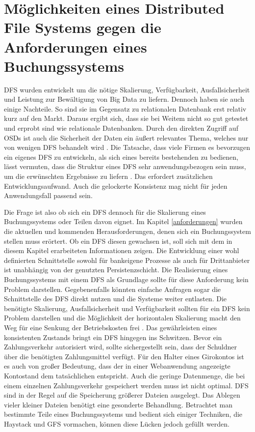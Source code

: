 \documentclass[12pt,oneside,a4paper,parskip]{scrbook}
\begin{document}
\section{Möglichkeiten eines Distributed File Systems gegen die Anforderungen eines Buchungssystems}
DFS wurden entwickelt um die nötige Skalierung, Verfügbarkeit, Ausfallsicherheit und Leistung zur Bewältigung von Big Data zu liefern. Dennoch haben sie auch einige Nachteile. So sind sie im Gegensatz zu relationalen Datenbank erst relativ kurz auf den Markt. Daraus ergibt sich, dass sie bei Weitem nicht so gut getestet und erprobt sind wie relationale Datenbanken. Durch den direkten Zugriff auf OSDs ist auch die Sicherheit der Daten ein äußert relevantes Thema, welches nur von wenigen DFS behandelt wird \cite{dfsDrawbacks}\cite{cephDrawbacks}. Die Tatsache, dass viele Firmen es bevorzugen ein eigenes DFS zu entwickeln, als sich eines bereits bestehenden zu bedienen, lässt vermuten, dass die Struktur eines DFS sehr anwendungsbezogen sein muss, um die erwünschten Ergebnisse zu liefern \cite{GFS}\cite{haystack}. Das erfordert zusätzlichen Entwicklungsaufwand. Auch die gelockerte Konsistenz mag nicht für jeden Anwendungsfall passend sein. 

Die Frage ist also ob sich ein DFS dennoch für die Skalierung eines Buchungssystems oder Teilen davon eignet. Im Kapitel \ref{anforderungen} wurden die aktuellen und kommenden Herausforderungen, denen sich ein Buchungssystem stellen muss erörtert. Ob ein DFS diesen gewachsen ist, soll sich mit dem in diesem Kapitel erarbeiteten Informationen zeigen.
Die Entwicklung einer wohl definierten Schnittstelle sowohl für bankeigene Prozesse als auch für Drittanbieter ist unabhängig von der genutzten Persistenzschicht. Die Realisierung eines Buchungssystems mit einem DFS als Grundlage sollte für diese Anforderung kein Problem darstellen. Gegebenenfalls könnten einfache Anfragen sogar die Schnittstelle des DFS direkt nutzen und die Systeme weiter entlasten.
Die benötigte Skalierung, Ausfallsicherheit und Verfügbarkeit sollten für ein DFS kein Problem darstellen und die Möglichkeit der horizontalen Skalierung macht den Weg für eine Senkung der Betriebskosten frei \cite{BASE}\cite{rdbmssuck}. Das gewährleisten eines konsistenten Zustands bringt ein DFS hingegen ins Schwitzen. Bevor ein Zahlungsverkehr autorisiert wird, sollte sichergestellt sein, dass der Schuldner über die benötigten Zahlungsmittel verfügt. Für den Halter eines Girokontos ist es auch von großer Bedeutung, dass der in einer Webanwendung angezeigte Kontostand dem tatsächlichen entspricht. Auch die geringe Datenmenge, die bei einem einzelnen Zahlungsverkehr gespeichert werden muss ist nicht optimal. DFS sind in der Regel auf die Speicherung größerer Dateien ausgelegt. Das Ablegen vieler kleiner Dateien benötigt eine gesonderte Behandlung. Betrachtet man bestimmte Teile eines Buchungssystems und bedient sich einiger Techniken, die Haystack und GFS vormachen, können diese Lücken jedoch gefüllt werden.
\end{document}
